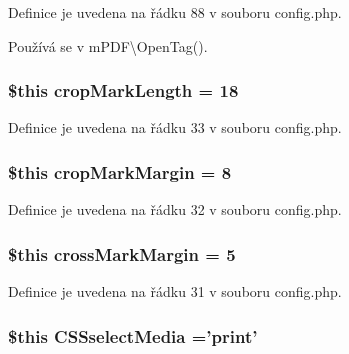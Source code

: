 Definice je uvedena na řádku 88 v souboru config.\-php.



Používá se v m\-P\-D\-F\textbackslash{}\-Open\-Tag().

\hypertarget{config_8php_a803fbf7b4e58e1aef2abf357fcdb2d30}{
\subsubsection[{crop\-Mark\-Length}]{\setlength{\rightskip}{0pt plus 5cm}\$this crop\-Mark\-Length = 18}}\label{config_8php_a803fbf7b4e58e1aef2abf357fcdb2d30}


Definice je uvedena na řádku 33 v souboru config.\-php.

\hypertarget{config_8php_a2d3a357d51469a8c5445f2c6618888a8}{
\subsubsection[{crop\-Mark\-Margin}]{\setlength{\rightskip}{0pt plus 5cm}\$this crop\-Mark\-Margin = 8}}\label{config_8php_a2d3a357d51469a8c5445f2c6618888a8}


Definice je uvedena na řádku 32 v souboru config.\-php.

\hypertarget{config_8php_aabd4ce24f2bf79414ecac594fce1a38c}{
\subsubsection[{cross\-Mark\-Margin}]{\setlength{\rightskip}{0pt plus 5cm}\$this cross\-Mark\-Margin = 5}}\label{config_8php_aabd4ce24f2bf79414ecac594fce1a38c}


Definice je uvedena na řádku 31 v souboru config.\-php.

\hypertarget{config_8php_a0a16123dfb4adc12bbe121ca999d348f}{
\subsubsection[{C\-S\-Sselect\-Media}]{\setlength{\rightskip}{0pt plus 5cm}\$this C\-S\-Sselect\-Media ='print'}}\label{config_8php_a0a16123dfb4adc12bbe121ca999d348f}


